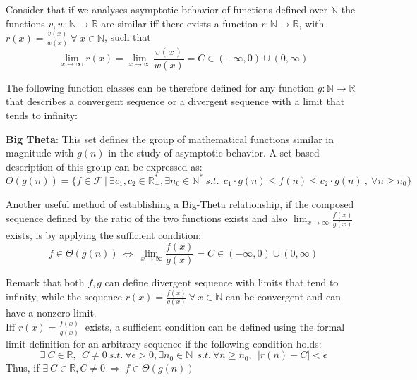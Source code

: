 \begin{lemma}
  Consider that if we analyses asymptotic behavior of functions defined over $\mathbb{N}$ the functions $v,w:\mathbb{N}\longrightarrow\mathbb{R}$ are similar iff there exists a function $r:\mathbb{N}\longrightarrow\mathbb{R}$, with $r(x) = \frac{v(x)}{w(x)}\ \forall\ x\in\mathbb{N}$, such that
  \[\lim_{x\to\infty} r(x) = \lim_{x\to\infty} \frac{v(x)}{w(x)} = C \in (-\infty, 0) \cup (0,\infty) \]
\end{lemma}

The following function classes can be therefore defined for any function $g:\mathbb{N}\longrightarrow\mathbb{R}$ that describes a convergent sequence or a divergent sequence with a limit that tends to infinity:
\begin{definition}   
  \textbf{Big Theta}: This set defines the group of mathematical functions similar in magnitude with  $g(n)$ in the study of asymptotic behavior. A set-based description of this group can be expressed as:
  \[\Theta(g(n))= \lbrace f \in \mathcal{F}\ |\ \exists c_{1}, c_{2} \in \mathbb{R}^{*}_{+}, \exists n_{0} \in \mathbb{N}^{*}\ s.t.\ \ c_{1} \cdot g(n) \leq f(n) \leq c_{2} \cdot g(n)\ ,\  \forall n \geq n_{0} \rbrace\]
\end{definition}  

\begin{lemma}
  Another useful method of establishing a Big-Theta relationship, if the composed sequence defined by the ratio of the two functions exists and also $ \lim_{x\to\infty} \frac{f(x)}{g(x)}$ exists, is by applying the sufficient condition:
    \[ f \in \Theta(g(n))\ \Leftrightarrow\ \lim_{x\to\infty} \frac{f(x)}{g(x)} = C \in (-\infty, 0) \cup (0,\infty) \]
\end{lemma}

Remark that  both $f,g$ can define divergent sequence with limits that tend to infinity, while the sequence $r(x) = \frac{f(x)}{g(x)}\ \forall\ x\in\mathbb{N}$ can be convergent and can have a nonzero limit. \\
Iff $ r(x) = \frac{f(x)}{g(x)}\ $ exists, a sufficient condition can be defined using the formal limit definition for an arbitrary sequence if the following condition holds:
  \[\exists \  C \in \mathbb{R}, \ \ C \neq 0 \ s.t. \ \forall \epsilon > 0,\exists n_{0} \in \mathbb{N}\ \ s.t.\ \forall n\geq n_{0}, \ \  |r(n) - C| < \epsilon  \]
  Thus, if $ \exists \  C \in \mathbb{R}, C \neq 0 \  \Rightarrow\  f \in \Theta(g(n))\ $


